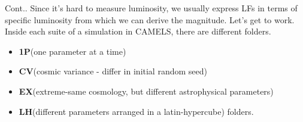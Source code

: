 \documentclass[10pt,t]{beamer}
\begin{document}
\begin{frame}{Cont..}
Since it's hard to measure luminosity, we usually express LFs in terms of specific luminosity from which we can derive the magnitude. 
\newline \newline
Let's get to work. \newline \newline
Inside each suite of a simulation in CAMELS, there are different folders.
\begin{itemize}
    \item\textbf{1P}(one parameter at a time) 
    \item\textbf{CV}(cosmic variance - differ in initial random seed)
    \item\textbf{EX}(extreme-same cosmology, but different astrophysical parameters)
    \item\textbf{LH}(different parameters arranged in a latin-hypercube) folders.
\end{itemize}
\end{frame}
\end{document}

